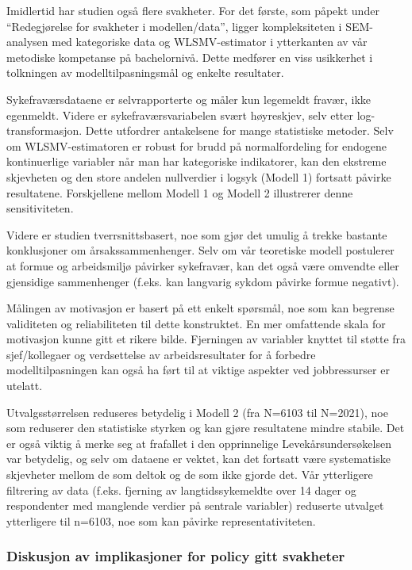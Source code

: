 \documentclass[
  12pt,
  a4paper,
  DIV=11,
  numbers=noendperiod]{scrartcl}
\begin{document}
Imidlertid har studien også flere svakheter. For det første, som påpekt
under ``Redegjørelse for svakheter i modellen/data'', ligger
kompleksiteten i SEM-analysen med kategoriske data og WLSMV-estimator i
ytterkanten av vår metodiske kompetanse på bachelornivå. Dette medfører
en viss usikkerhet i tolkningen av modelltilpasningsmål og enkelte
resultater.

Sykefraværsdataene er selvrapporterte og måler kun legemeldt fravær,
ikke egenmeldt. Videre er sykefraværsvariabelen svært høyreskjev, selv
etter log-transformasjon. Dette utfordrer antakelsene for mange
statistiske metoder. Selv om WLSMV-estimatoren er robust for brudd på
normalfordeling for endogene kontinuerlige variabler når man har
kategoriske indikatorer, kan den ekstreme skjevheten og den store
andelen nullverdier i logsyk (Modell 1) fortsatt påvirke resultatene.
Forskjellene mellom Modell 1 og Modell 2 illustrerer denne
sensitiviteten.

Videre er studien tverrsnittsbasert, noe som gjør det umulig å trekke
bastante konklusjoner om årsakssammenhenger. Selv om vår teoretiske
modell postulerer at formue og arbeidsmiljø påvirker sykefravær, kan det
også være omvendte eller gjensidige sammenhenger (f.eks. kan langvarig
sykdom påvirke formue negativt).

Målingen av motivasjon er basert på ett enkelt spørsmål, noe som kan
begrense validiteten og reliabiliteten til dette konstruktet. En mer
omfattende skala for motivasjon kunne gitt et rikere bilde. Fjerningen
av variabler knyttet til støtte fra sjef/kollegaer og verdsettelse av
arbeidsresultater for å forbedre modelltilpasningen kan også ha ført til
at viktige aspekter ved jobbressurser er utelatt.

Utvalgsstørrelsen reduseres betydelig i Modell 2 (fra N=6103 til
N=2021), noe som reduserer den statistiske styrken og kan gjøre
resultatene mindre stabile. Det er også viktig å merke seg at frafallet
i den opprinnelige Levekårsundersøkelsen var betydelig, og selv om
dataene er vektet, kan det fortsatt være systematiske skjevheter mellom
de som deltok og de som ikke gjorde det. Vår ytterligere filtrering av
data (f.eks. fjerning av langtidssykemeldte over 14 dager og
respondenter med manglende verdier på sentrale variabler) reduserte
utvalget ytterligere til n=6103, noe som kan påvirke
representativiteten.

\subsubsection{Diskusjon av implikasjoner for policy gitt
svakheter}\label{diskusjon-av-implikasjoner-for-policy-gitt-svakheter}
\end{document}
